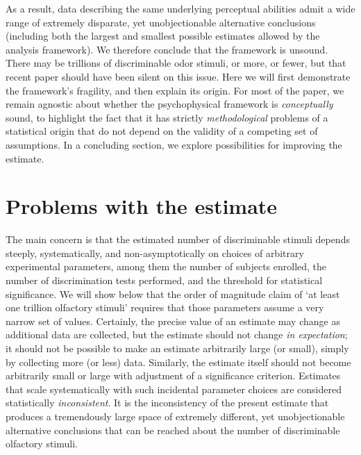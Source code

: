 \documentclass[letterpaper,twocolumn,10pt]{article}
\begin{document}
As a result, data describing the same underlying perceptual abilities admit a wide range of extremely disparate, 
yet unobjectionable alternative conclusions (including both the largest and smallest possible estimates allowed by the analysis framework). 
We therefore conclude that the framework is unsound. 
There may be trillions of discriminable odor stimuli, or more, or fewer, 
but that recent paper should have been silent on this issue.  
Here we will first demonstrate the framework's fragility, and then explain its origin. 
For most of the paper, we remain agnostic about whether the psychophysical framework is \textit{conceptually} sound, 
to highlight the fact that it has strictly \textit{methodological} problems of a statistical origin that do not depend on the validity of a competing set of assumptions. %
In a concluding section, we explore possibilities for improving the estimate. 

\section{Problems with the estimate}
\label{sec:demonstration}

The main concern is that the estimated number of discriminable stimuli depends steeply, systematically, and non-asymptotically on choices of arbitrary experimental parameters, 
among them the number of subjects enrolled, the number of discrimination tests performed, and the threshold for statistical significance.  
We will show below that the order of magnitude claim of `at least one trillion olfactory stimuli' requires that those parameters assume a very narrow set of values. 
Certainly, the precise value of an estimate may change as additional data are collected, 
but the estimate should not change \textit{in expectation}; it should not be possible to make an estimate arbitrarily large (or small), 
simply by collecting more (or less) data. Similarly, the estimate itself should not become arbitrarily small or large with adjustment of a significance criterion. Estimates that scale systematically with such incidental parameter choices are considered statistically \textit{inconsistent}. It is the inconsistency of the present estimate that produces a tremendously large space of extremely different, yet unobjectionable alternative conclusions that can be reached about the number of discriminable olfactory stimuli. 
\end{document}
